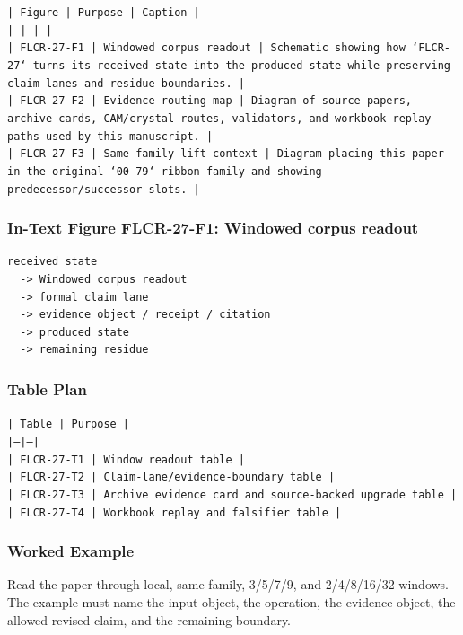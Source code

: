 \documentclass[11pt]{article}
\begin{document}
\noindent\texttt{| Figure | Purpose | Caption |}\\
\noindent\texttt{|---|---|---|}\\
\noindent\texttt{| FLCR-27-F1 | Windowed corpus readout | Schematic showing how `FLCR-27` turns its received state into the produced state while preserving claim lanes and residue boundaries. |}\\
\noindent\texttt{| FLCR-27-F2 | Evidence routing map | Diagram of source papers, archive cards, CAM/crystal routes, validators, and workbook replay paths used by this manuscript. |}\\
\noindent\texttt{| FLCR-27-F3 | Same-family lift context | Diagram placing this paper in the original `00-79` ribbon family and showing predecessor/successor slots. |}\\

\subsubsection*{In-Text Figure FLCR-27-F1: Windowed corpus readout}

\begin{verbatim}
received state
  -> Windowed corpus readout
  -> formal claim lane
  -> evidence object / receipt / citation
  -> produced state
  -> remaining residue
\end{verbatim}

\subsubsection*{Table Plan}

\noindent\texttt{| Table | Purpose |}\\
\noindent\texttt{|---|---|}\\
\noindent\texttt{| FLCR-27-T1 | Window readout table |}\\
\noindent\texttt{| FLCR-27-T2 | Claim-lane/evidence-boundary table |}\\
\noindent\texttt{| FLCR-27-T3 | Archive evidence card and source-backed upgrade table |}\\
\noindent\texttt{| FLCR-27-T4 | Workbook replay and falsifier table |}\\

\subsubsection*{Worked Example}

Read the paper through local, same-family, 3/5/7/9, and 2/4/8/16/32 windows. The example must name the input object, the operation,
the evidence object, the allowed revised claim, and the remaining boundary.
\end{document}

